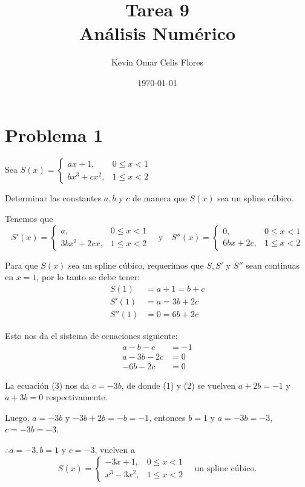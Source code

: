 \documentclass[11pt, oneside]{article}
\title{Tarea 9\\Análisis Numérico}
\author{Kevin Omar Celis Flores}
\date{\today}
\begin{document}
\maketitle

\section*{Problema 1}

Sea $S(x) = \begin{cases} ax + 1, & 0 \le x < 1 \\ bx^3 + cx^2, & 1 \le x < 2 \end{cases}$

Determinar las constantes $a, b$ y $c$ de manera que $S(x)$ sea un spline cúbico.

Tenemos que
\[ S'(x) = \begin{cases} a, & 0 \le x < 1 \\ 3bx^2 + 2cx, & 1 \le x < 2 \end{cases} \quad \text{y} \quad S''(x) = \begin{cases} 0, & 0 \le x < 1 \\ 6bx + 2c, & 1 \le x < 2 \end{cases} \]

Para que $S(x)$ sea un spline cúbico, requerimos que $S, S'$ y $S''$ sean continuas en $x=1$, por lo tanto se debe tener:
\begin{align*}
    S(1) &= a + 1 = b + c \\
    S'(1) &= a = 3b + 2c \\
    S''(1) &= 0 = 6b + 2c
\end{align*}

Esto nos da el sistema de ecuaciones siguiente:
\begin{align}
    a - b - c &= -1 \\
    a - 3b - 2c &= 0 \\
    -6b - 2c &= 0
\end{align}

La ecuación (3) nos da $c = -3b$, de donde (1) y (2) se vuelven $a + 2b = -1$ y $a + 3b = 0$ respectivamente.

Luego, $a = -3b$ y $-3b + 2b = -b = -1$, entonces $b = 1$ y $a = -3b = -3$, $c = -3b = -3$.

$\therefore a = -3, b = 1$ y $c = -3$, vuelven a
\[ S(x) = \begin{cases} -3x + 1, & 0 \le x < 1 \\ x^3 - 3x^2, & 1 \le x < 2 \end{cases} \quad \text{un spline cúbico.} \]
\end{document}

